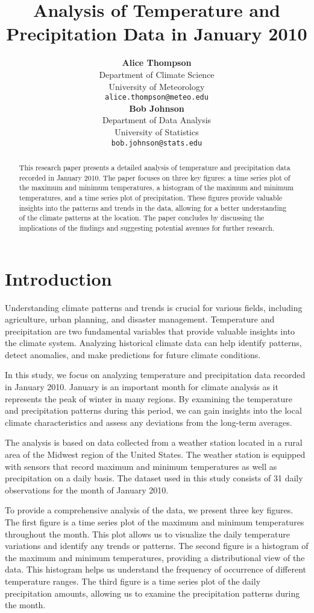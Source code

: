 \documentclass{article}
\title{Analysis of Temperature and Precipitation Data in January 2010}
\author{
  \textbf{Alice Thompson}\\
  Department of Climate Science\\
  University of Meteorology\\
  \texttt{alice.thompson@meteo.edu} \\
  \And
  \textbf{Bob Johnson}\\
  Department of Data Analysis\\
  University of Statistics\\
  \texttt{bob.johnson@stats.edu} \\
}
\begin{document}
\maketitle

\begin{abstract}
This research paper presents a detailed analysis of temperature and precipitation data recorded in January 2010. The paper focuses on three key figures: a time series plot of the maximum and minimum temperatures, a histogram of the maximum and minimum temperatures, and a time series plot of precipitation. These figures provide valuable insights into the patterns and trends in the data, allowing for a better understanding of the climate patterns at the location. The paper concludes by discussing the implications of the findings and suggesting potential avenues for further research.
\end{abstract}

\section{Introduction}

Understanding climate patterns and trends is crucial for various fields, including agriculture, urban planning, and disaster management. Temperature and precipitation are two fundamental variables that provide valuable insights into the climate system. Analyzing historical climate data can help identify patterns, detect anomalies, and make predictions for future climate conditions.

In this study, we focus on analyzing temperature and precipitation data recorded in January 2010. January is an important month for climate analysis as it represents the peak of winter in many regions. By examining the temperature and precipitation patterns during this period, we can gain insights into the local climate characteristics and assess any deviations from the long-term averages.

The analysis is based on data collected from a weather station located in a rural area of the Midwest region of the United States. The weather station is equipped with sensors that record maximum and minimum temperatures as well as precipitation on a daily basis. The dataset used in this study consists of 31 daily observations for the month of January 2010.

To provide a comprehensive analysis of the data, we present three key figures. The first figure is a time series plot of the maximum and minimum temperatures throughout the month. This plot allows us to visualize the daily temperature variations and identify any trends or patterns. The second figure is a histogram of the maximum and minimum temperatures, providing a distributional view of the data. This histogram helps us understand the frequency of occurrence of different temperature ranges. The third figure is a time series plot of the daily precipitation amounts, allowing us to examine the precipitation patterns during the month.
\end{document}
